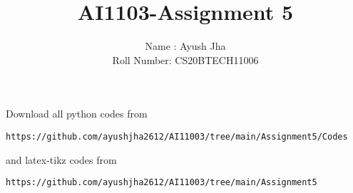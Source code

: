 \documentclass[journal,12pt,twocolumn]{IEEEtran}
\DeclareMathOperator*{\Res}{Res}
\begin{document}
\newcommand{\BEQA}{\begin{eqnarray}}
\newcommand{\EEQA}{\end{eqnarray}}
\newcommand{\define}{\stackrel{\triangle}{=}}

\raggedbottom
\setlength{\parindent}{0pt}
\providecommand{\mbf}{\mathbf}
\providecommand{\pr}[1]{\ensuremath{\Pr\left(#1\right)}}
\providecommand{\qfunc}[1]{\ensuremath{Q\left(#1\right)}}
\providecommand{\sbrak}[1]{\ensuremath{{}\left[#1\right]}}
\providecommand{\lsbrak}[1]{\ensuremath{{}\left[#1\right.}}
\providecommand{\rsbrak}[1]{\ensuremath{{}\left.#1\right]}}
\providecommand{\brak}[1]{\ensuremath{\left(#1\right)}}
\providecommand{\lbrak}[1]{\ensuremath{\left(#1\right.}}
\providecommand{\rbrak}[1]{\ensuremath{\left.#1\right)}}
\providecommand{\cbrak}[1]{\ensuremath{\left\{#1\right\}}}
\providecommand{\lcbrak}[1]{\ensuremath{\left\{#1\right.}}
\providecommand{\rcbrak}[1]{\ensuremath{\left.#1\right\}}}
\theoremstyle{remark}
\newtheorem{rem}{Remark}
\newcommand{\sgn}{\mathop{\mathrm{sgn}}}
\providecommand{\abs}[1]{\vert#1\vert}
\providecommand{\res}[1]{\Res\displaylimits_{#1}} 
\providecommand{\norm}[1]{\lVert#1\rVert}
\providecommand{\mtx}[1]{\mathbf{#1}}
\providecommand{\mean}[1]{E[ #1 ]}
\providecommand{\fourier}{\overset{\mathcal{F}}{ \rightleftharpoons}}
\providecommand{\system}{\overset{\mathcal{H}}{ \longleftrightarrow}}
\newcommand{\solution}{\noindent \textbf{Solution: }}
\newcommand{\cosec}{\,\text{cosec}\,}
\providecommand{\dec}[2]{\ensuremath{\overset{#1}{\underset{#2}{\gtrless}}}}
\newcommand{\myvec}[1]{\ensuremath{\begin{pmatrix}#1\end{pmatrix}}}
\newcommand{\mydet}[1]{\ensuremath{\begin{vmatrix}#1\end{vmatrix}}}
\makeatletter
{}
\makeatother
\let\StandardTheFigure\thefigure
\let\vec\mathbf
\renewcommand{\thefigure}{\theproblem}
\def\putbox#1#2#3{\makebox[0in][l]{\makebox[#1][l]{}\raisebox{\baselineskip}[0in][0in]{\raisebox{#2}[0in][0in]{#3}}}}
     \def\rightbox#1{\makebox[0in][r]{#1}}
     \def\centbox#1{\makebox[0in]{#1}}
     \def\topbox#1{\raisebox{-\baselineskip}[0in][0in]{#1}}
     \def\midbox#1{\raisebox{-0.5\baselineskip}[0in][0in]{#1}}
\vspace{3cm}
\title{AI1103-Assignment 5}
\author{Name : Ayush Jha \\ Roll Number: CS20BTECH11006}
\maketitle
\newpage
\bigskip
\renewcommand{\thefigure}{\theenumi}
\renewcommand{\thetable}{\theenumi}
Download all python codes from 
\begin{lstlisting}
https://github.com/ayushjha2612/AI11003/tree/main/Assignment5/Codes
\end{lstlisting}
%
and latex-tikz codes from 
%
\begin{lstlisting}
https://github.com/ayushjha2612/AI11003/tree/main/Assignment5
\end{lstlisting}
\end{document}
